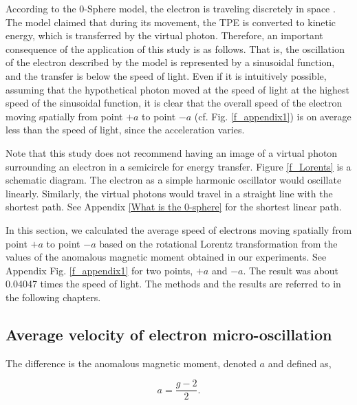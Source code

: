 \documentclass[10.5pt]{article}
\numberwithin{equation}{section}
\begin{document}
According to the 0-Sphere model, the electron is traveling discretely in space \cite{Hanamura2}. The model claimed that during its movement, the TPE is converted to kinetic energy, which is transferred by the virtual photon. Therefore, an important consequence of the application of this study is as follows. That is, the oscillation of the electron described by the model is represented by a sinusoidal function, and the transfer is below the speed of light. Even if it is intuitively possible, assuming that the hypothetical photon moved at the speed of light at the highest speed of the sinusoidal function, it is clear that the overall speed of the electron moving spatially from point $+a$ to point $-a$ (cf. Fig. \ref{f_appendix1}) is on average less than the speed of light, since the acceleration varies.

Note that this study does not recommend having an image of a virtual photon surrounding an electron in a semicircle for energy transfer. Figure \ref{f_Lorents} is a schematic diagram. The electron as a simple harmonic oscillator would oscillate linearly. Similarly, the virtual photons would travel in a straight line with the shortest path. See Appendix \ref{What is the 0-sphere} for the shortest linear path.

In this section, we calculated the average speed of electrons moving spatially from point $+a$ to point $-a$ based on the rotational Lorentz transformation from the values of the anomalous magnetic moment obtained in our experiments. See Appendix Fig. \ref{f_appendix1} for two points, $+a$ and $-a$. The result was about 0.04047 times the speed of light. The methods and the results are referred to in the following chapters.


\subsection{Average velocity of electron micro-oscillation}


The difference is the anomalous magnetic moment, denoted $a$ and defined as,

    \begin{equation}
        {\displaystyle a={\frac {g-2}{2}}} .
        \label{III.1}
    \end{equation}
\end{document}

